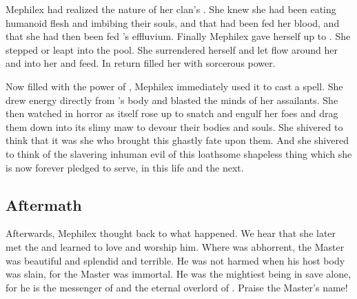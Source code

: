Mephilex had realized the nature of her clan's .
She knew she had been eating humanoid flesh and imbibing their souls, and that \Ubloth had been fed her blood, and that she had then been fed \Ubloth's effluvium. 
Finally Mephilex gave herself up to \Ubloth. 
She stepped or leapt into the pool.
She surrendered herself and let \Ubloth flow around her and into her and feed.
In return \Ubloth filled her with sorcerous power. 

Now filled with the power of \Ubloth, Mephilex immediately used it to cast a spell.
She drew energy directly from \Ubloth's body and blasted the minds of her assailants.
She then watched in horror as \Ubloth itself rose up to snatch and engulf her foes and drag them down into its slimy maw to devour their bodies and souls.
She shivered to think that it was she who brought this ghastly fate upon them.
And she shivered to think of the slavering inhuman evil of this loathsome shapeless thing which she is now forever pledged to serve, in this life and the next. 









\subsection{Aftermath}
Afterwards, Mephilex thought back to what happened. 
We hear that she later met the  and learned to love and worship him. 
Where \Ubloth was abhorrent, the Master was beautiful and splendid and terrible. 
He was not harmed when his host body was slain, for the Master was immortal.
He was the mightiest being in \Yormis save \Ubloth alone, for he is the messenger of \Ubloth and the eternal overlord of \Yormis. 
Praise the Master's name!















